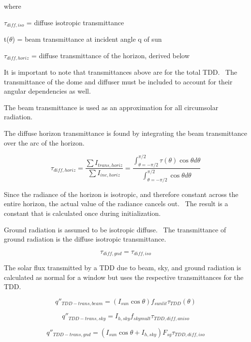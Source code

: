 where

\(\tau_{diff,iso}\) = diffuse isotropic transmittance

t(\(\theta\)) = beam transmittance at incident angle q of sun

\(\tau_{diff,horiz}\) = diffuse transmittance of the horizon, derived below

It is important to note that transmittances above are for the total TDD.~ The transmittance of the dome and diffuser must be included to account for their angular dependencies as well.

The beam transmittance is used as an approximation for all circumsolar radiation.

The diffuse horizon transmittance is found by integrating the beam transmittance over the arc of the horizon.

\begin{equation}
{\tau_{diff,horiz}} = \frac{{\sum {{I_{trans,horiz}}} }}{{\sum {{I_{inc,horiz}}} }} = \frac{{\int_{\theta  =  - \pi /2}^{\pi /2} {\tau (\theta )\cos \theta d\theta } }}{{\int_{\theta  =  - \pi /2}^{\pi /2} {\cos \theta d\theta } }}
\end{equation}

Since the radiance of the horizon is isotropic, and therefore constant across the entire horizon, the actual value of the radiance cancels out.~ The result is a constant that is calculated once during initialization.

Ground radiation is assumed to be isotropic diffuse.~ The transmittance of ground radiation is the diffuse isotropic transmittance.

\begin{equation}
{\tau_{diff,gnd}} = {\tau_{diff,iso}}
\end{equation}

The solar flux transmitted by a TDD due to beam, sky, and ground radiation is calculated as normal for a window but uses the respective transmittances for the TDD.

\begin{equation}
{q''_{TDD - trans,beam}} = \left( {{I_{sun}}\cos \theta } \right){f_{sunlit}}{\tau_{TDD}}(\theta )
\end{equation}

\begin{equation}
{q''_{TDD - trans,sky}} = {I_{h,sky}}{f_{skymult}}{\tau_{TDD,diff,aniso}}
\end{equation}

\begin{equation}
{q''_{TDD - trans,gnd}} = \left( {{I_{sun}}\cos \theta  + {I_{h,sky}}} \right){F_{sg}}{\tau_{TDD,diff,iso}}
\end{equation}

